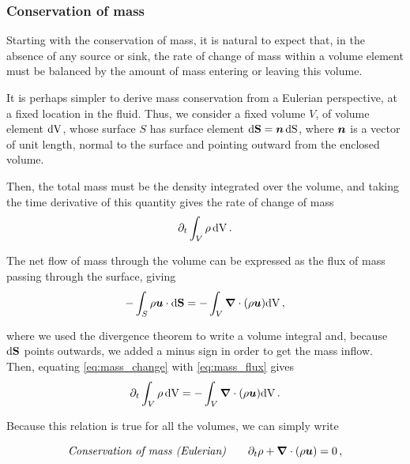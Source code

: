 \subsubsection{Conservation of mass} \label{sec:fluid_eq_mass}

Starting with the conservation of mass, it is natural to expect that, in the absence of any source or sink, the rate of change of mass within a volume element must be balanced by the amount of mass entering or leaving this volume.

It is perhaps simpler to derive mass conservation from a Eulerian perspective, at a fixed location in the fluid. Thus, we consider a fixed volume \(V\), of volume element \(\upd[V]\), whose surface \(S\) has surface element \(\updvec{S} = \fvec{n}\,\upd[S]\), where \(\fvec{n}\) is a vector of unit length, normal to the surface and pointing outward from the enclosed volume.

Then, the total mass must be the density integrated over the volume, and taking the time derivative of this quantity gives the rate of change of mass
\begin{equation}
    \partial_t \int_V \rho\,\upd[V] \punct{.} \label{eq:mass_change}
\end{equation}

The net flow of mass through the volume can be expressed as the flux of mass passing through the surface, giving
\begin{equation}
    - \int_S \rho \fvec{u} \cdot \updvec{S} = - \int_V \nablavec \cdot (\rho \fvec{u}) \upd[V] \punct{,} \label{eq:mass_flux}
\end{equation}

where we used the divergence theorem to write a volume integral and, because \(\updvec{S}\) points outwards, we added a minus sign in order to get the mass inflow. Then, equating \ref{eq:mass_change} with \ref{eq:mass_flux} gives
\begin{equation}
    \partial_t \int_V \rho\,\upd[V] = - \int_V \nablavec \cdot (\rho \fvec{u}) \upd[V] \punct{.}
\end{equation}

Because this relation is true for all the volumes, we can simply write
\begin{boxedeq}
    \begin{equation}
        \textit{Conservation of mass (Eulerian)} \qquad \partial_t \rho + \nablavec \cdot (\rho \fvec{u}) = 0 \punct{,} \label{eq:mass_eul}
    \end{equation}
\end{boxedeq}

